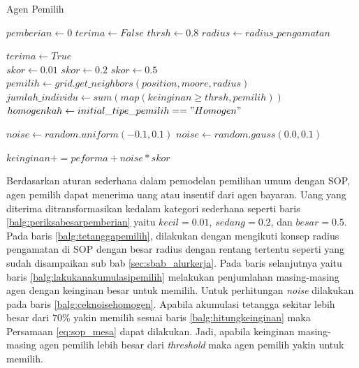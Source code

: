 \begin{algorithm}[H]
	\caption{Agen Pemilih}\label{alg:agenpemilih}
	\begin{algorithmic}[1]
			\State $pemberian \gets 0$
			\State $terima \gets False$
			\State $thrsh \gets 0.8$
			\State $radius \gets radius\_pengamatan$

					\State $terima \gets True$
				\EndIf
				\\
				\label{balg:periksabesarpemberian}
					\State $skor \gets 0.01$
					\State $skor \gets 0.2$
				\Else
						\State $skor \gets 0.5$
				\EndIf
				\\
				\State $pemilih \gets grid.get\_neighbors(position, moore, radius)$\label{balg:tetanggapemilih}
				\State $jumlah\_individu \gets sum(map(keinginan \geq thrsh,pemilih))$\label{balg:lakukanakumulasipemilih}
				\State $homogenkah \gets initial\_tipe\_pemilih == "Homogen"$

				\label{balg:ceknoisehomogen}
					\State $noise \gets random.uniform(-0.1, 0.1)$
				\Else
					\State $noise \gets random.gauss(0.0, 0.1)$
				\EndIf

				\label{balg:hitungkeinginan}
					\State $keinginan += peforma + noise * skor$
				\EndIf
			\EndWhile
		\EndProcedure
	\end{algorithmic}
\end{algorithm}

Berdasarkan aturan sederhana dalam pemodelan pemilihan umum dengan SOP, agen pemilih dapat menerima uang atau insentif dari agen bayaran. Uang yang diterima ditransformasikan kedalam kategori sederhana seperti baris \ref{balg:periksabesarpemberian} yaitu $kecil=0.01$, $sedang=0.2$, dan $besar=0.5$. Pada baris \ref{balg:tetanggapemilih}, dilakukan dengan mengikuti konsep radius pengamatan di SOP dengan besar radius dengan rentang tertentu seperti yang sudah disampaikan sub bab \ref{sec:sbab_alurkerja}. Pada baris selanjutnya yaitu baris \ref{balg:lakukanakumulasipemilih} melakukan penjumlahan masing-masing agen dengan keinginan besar untuk memilih. Untuk perhitungan \textit{noise} dilakukan pada baris \ref{balg:ceknoisehomogen}. Apabila akumulasi tetangga sekitar lebih besar dari $70\%$ yakin memilih sesuai baris \ref{balg:hitungkeinginan} maka Persamaan \ref{eq:sop_mesa} dapat dilakukan. Jadi, apabila keinginan masing-masing agen pemilih lebih besar dari \textit{threshold} maka agen pemilih yakin untuk memilih.
